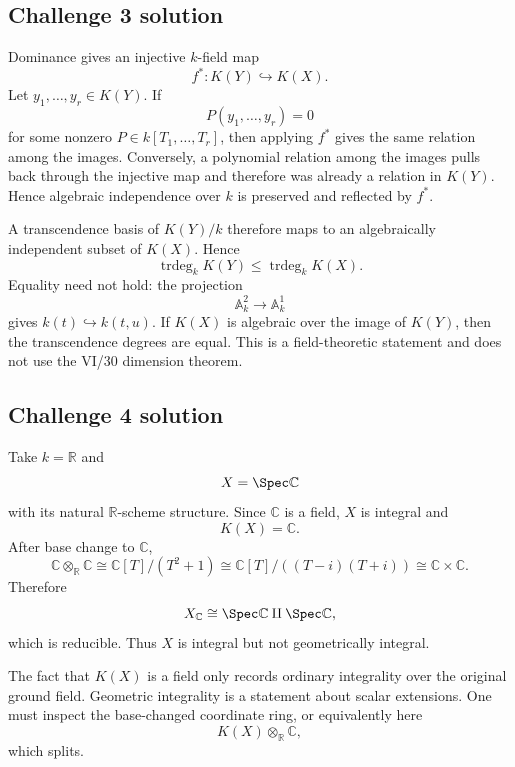 \subsection*{Challenge 3 solution}
\begin{solution}
Dominance gives an injective \(k\)-field map
\[
f^*:K(Y)\hookrightarrow K(X).
\]
Let \(y_1,\ldots,y_r\in K(Y)\). If
\[
P(y_1,\ldots,y_r)=0
\]
for some nonzero \(P\in k[T_1,\ldots,T_r]\), then applying \(f^*\) gives the same relation among the images.
Conversely, a polynomial relation among the images pulls back through the injective map and therefore was already
a relation in \(K(Y)\). Hence algebraic independence over \(k\) is preserved and reflected by \(f^*\).

A transcendence basis of \(K(Y)/k\) therefore maps to an algebraically independent subset of \(K(X)\). Hence
\[
\operatorname{trdeg}_kK(Y)\le\operatorname{trdeg}_kK(X).
\]
Equality need not hold: the projection
\[
\mathbb A^2_k\to\mathbb A^1_k
\]
gives \(k(t)\hookrightarrow k(t,u)\). If \(K(X)\) is algebraic over the image of \(K(Y)\), then the
transcendence degrees are equal. This is a field-theoretic statement and does not use the VI/30 dimension theorem.
\end{solution}

\subsection*{Challenge 4 solution}
\begin{solution}
Take \(k=\mathbb R\) and
\[
X=\Spec\mathbb C
\]
with its natural \(\mathbb R\)-scheme structure. Since \(\mathbb C\) is a field, \(X\) is integral and
\[
K(X)=\mathbb C.
\]
After base change to \(\mathbb C\),
\[
\mathbb C\otimes_{\mathbb R}\mathbb C
\cong
\mathbb C[T]/(T^2+1)
\cong
\mathbb C[T]/((T-i)(T+i))
\cong
\mathbb C\times\mathbb C.
\]
Therefore
\[
X_{\mathbb C}\cong\Spec\mathbb C\amalg\Spec\mathbb C,
\]
which is reducible. Thus \(X\) is integral but not geometrically integral.

The fact that \(K(X)\) is a field only records ordinary integrality over the original ground field. Geometric
integrality is a statement about scalar extensions. One must inspect the base-changed coordinate ring, or
equivalently here
\[
K(X)\otimes_{\mathbb R}\mathbb C,
\]
which splits.
\end{solution}

